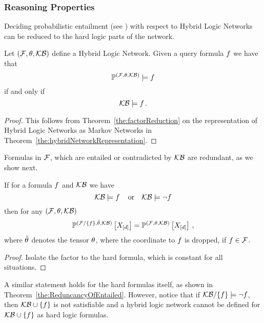 \subsubsection{Reasoning Properties}

Deciding probabilistic entailment (see ) with respect to Hybrid Logic Networks can be reduced to the hard logic parts of the network.

\begin{theorem}\label{the:hlnEntailmentReduction}
	Let $(\mathcal{F},\theta,\mathcal{KB})$ define a Hybrid Logic Network.
	Given a query formula $f$ we have that 
		\[ \mathbb{P}^{(\mathcal{F},\theta,\mathcal{KB})} \models f \]
	if and only if
		\[ \mathcal{KB} \models f \, . \]
\end{theorem}
\begin{proof}
	This follows from Theorem~\ref{the:factorReduction} on the representation of Hybrid Logic Networks as Markov Networks in Theorem~\ref{the:hybridNetworkRepresentation}.
\end{proof}


Formulas in $\mathcal{F}$, which are entailed or contradicted by $\mathcal{KB}$ are redundant, as we show next.

\begin{theorem}%
	If for a formula $f$ and $\mathcal{KB}$ we have 
		\[ \mathcal{KB} \models f \, \quad \text{or} \quad \mathcal{KB} \models \lnot f \]
	then for any $(\mathcal{F},\theta,\mathcal{KB})$
		\[ \mathbb{P}^{(\mathcal{F}/\{f\},\tilde{\theta},\mathcal{KB})}\left[X_{[d]}\right] =  \mathbb{P}^{(\mathcal{F},\theta,\mathcal{KB})}\left[X_{[d]}\right]  \, , \]
	where $\tilde{\theta}$ denotes the tensor $\theta$, where the coordinate to $f$ is dropped, if $f\in\mathcal{F}$.
\end{theorem}
\begin{proof}
	Isolate the factor to the hard formula, which is constant for all situations.
\end{proof}

A similar statement holds for the hard formulas itself, as shown in Theorem~\ref{the:ReduncancyOfEntailed}.
However, notice that if $\mathcal{KB}/\{f\}\models\lnot f$, then $\mathcal{KB}\cup\{f\}$ is not satisfiable and a hybrid logic network cannot be defined for $\mathcal{KB}\cup\{f\}$ as hard logic formulas.

